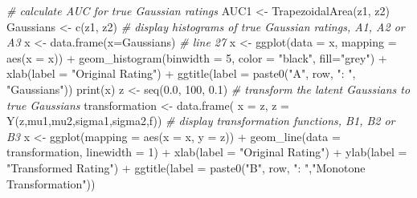 \documentclass[
]{book}
\newenvironment{Shaded}{\begin{snugshade}}{\end{snugshade}}
\newcommand{\AttributeTok}[1]{\textcolor[rgb]{0.77,0.63,0.00}{#1}}
\newcommand{\CommentTok}[1]{\textcolor[rgb]{0.56,0.35,0.01}{\textit{#1}}}
\newcommand{\DecValTok}[1]{\textcolor[rgb]{0.00,0.00,0.81}{#1}}
\newcommand{\FloatTok}[1]{\textcolor[rgb]{0.00,0.00,0.81}{#1}}
\newcommand{\FunctionTok}[1]{\textcolor[rgb]{0.00,0.00,0.00}{#1}}
\newcommand{\NormalTok}[1]{#1}
\newcommand{\OtherTok}[1]{\textcolor[rgb]{0.56,0.35,0.01}{#1}}
\newcommand{\SpecialCharTok}[1]{\textcolor[rgb]{0.00,0.00,0.00}{#1}}
\newcommand{\StringTok}[1]{\textcolor[rgb]{0.31,0.60,0.02}{#1}}
\begin{document}
\begin{Shaded}
\begin{Highlighting}[]
  \CommentTok{\# calculate AUC for true Gaussian ratings}
\NormalTok{  AUC1 }\OtherTok{\textless{}{-}} \FunctionTok{TrapezoidalArea}\NormalTok{(z1, z2)}
\NormalTok{  Gaussians }\OtherTok{\textless{}{-}} \FunctionTok{c}\NormalTok{(z1, z2)}
  \CommentTok{\# display histograms of true Gaussian ratings, A1, A2 or A3}
\NormalTok{  x }\OtherTok{\textless{}{-}} \FunctionTok{data.frame}\NormalTok{(}\AttributeTok{x=}\NormalTok{Gaussians) }\CommentTok{\#  line 27}
\NormalTok{  x }\OtherTok{\textless{}{-}}  
    \FunctionTok{ggplot}\NormalTok{(}\AttributeTok{data =}\NormalTok{ x, }\AttributeTok{mapping =} \FunctionTok{aes}\NormalTok{(}\AttributeTok{x =}\NormalTok{ x)) }\SpecialCharTok{+}
    \FunctionTok{geom\_histogram}\NormalTok{(}\AttributeTok{binwidth =} \DecValTok{5}\NormalTok{, }\AttributeTok{color =} \StringTok{"black"}\NormalTok{, }\AttributeTok{fill=}\StringTok{"grey"}\NormalTok{) }\SpecialCharTok{+} 
    \FunctionTok{xlab}\NormalTok{(}\AttributeTok{label =} \StringTok{"Original Rating"}\NormalTok{) }\SpecialCharTok{+} 
    \FunctionTok{ggtitle}\NormalTok{(}\AttributeTok{label =} \FunctionTok{paste0}\NormalTok{(}\StringTok{"A"}\NormalTok{, row, }\StringTok{": "}\NormalTok{, }\StringTok{"Gaussians"}\NormalTok{))}
  \FunctionTok{print}\NormalTok{(x)}
\NormalTok{  z }\OtherTok{\textless{}{-}} \FunctionTok{seq}\NormalTok{(}\FloatTok{0.0}\NormalTok{, }\DecValTok{100}\NormalTok{, }\FloatTok{0.1}\NormalTok{)}
  \CommentTok{\# transform the latent Gaussians to true Gaussians}
\NormalTok{  transformation }\OtherTok{\textless{}{-}} 
    \FunctionTok{data.frame}\NormalTok{(}
      \AttributeTok{x =}\NormalTok{ z, }
      \AttributeTok{z =}  \FunctionTok{Y}\NormalTok{(z,mu1,mu2,sigma1,sigma2,f))}
  \CommentTok{\# display transformation functions, B1, B2 or B3}
\NormalTok{  x }\OtherTok{\textless{}{-}} 
    \FunctionTok{ggplot}\NormalTok{(}\AttributeTok{mapping =} \FunctionTok{aes}\NormalTok{(}\AttributeTok{x =}\NormalTok{ x, }\AttributeTok{y =}\NormalTok{ z)) }\SpecialCharTok{+} 
    \FunctionTok{geom\_line}\NormalTok{(}\AttributeTok{data =}\NormalTok{ transformation, }\AttributeTok{linewidth =} \DecValTok{1}\NormalTok{) }\SpecialCharTok{+}
    \FunctionTok{xlab}\NormalTok{(}\AttributeTok{label =} \StringTok{"Original Rating"}\NormalTok{) }\SpecialCharTok{+}
    \FunctionTok{ylab}\NormalTok{(}\AttributeTok{label =} \StringTok{"Transformed Rating"}\NormalTok{) }\SpecialCharTok{+} 
    \FunctionTok{ggtitle}\NormalTok{(}\AttributeTok{label =} \FunctionTok{paste0}\NormalTok{(}\StringTok{"B"}\NormalTok{, row, }\StringTok{": "}\NormalTok{,}\StringTok{"Monotone Transformation"}\NormalTok{))}

\end{Highlighting}
\end{Shaded}
\end{document}
